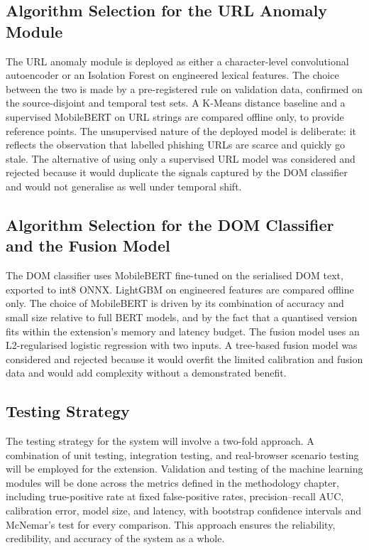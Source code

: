 \documentclass{FastFyp}
\begin{document}
\subsection{Algorithm Selection for the URL Anomaly Module}
The URL anomaly module is deployed as either a character-level convolutional autoencoder or an Isolation Forest on engineered lexical features. The choice between the two is made by a pre-registered rule on validation data, confirmed on the source-disjoint and temporal test sets. A K-Means distance baseline and a supervised MobileBERT on URL strings are compared offline only, to provide reference points. The unsupervised nature of the deployed model is deliberate: it reflects the observation that labelled phishing URLs are scarce and quickly go stale. The alternative of using only a supervised URL model was considered and rejected because it would duplicate the signals captured by the DOM classifier and would not generalise as well under temporal shift.

\subsection{Algorithm Selection for the DOM Classifier and the Fusion Model}
The DOM classifier uses MobileBERT fine-tuned on the serialised DOM text, exported to int8 ONNX. LightGBM on engineered features are compared offline only. The choice of MobileBERT is driven by its combination of accuracy and small size relative to full BERT models, and by the fact that a quantised version fits within the extension's memory and latency budget. The fusion model uses an L2-regularised logistic regression with two inputs. A tree-based fusion model was considered and rejected because it would overfit the limited calibration and fusion data and would add complexity without a demonstrated benefit.

\subsection{Testing Strategy}
The testing strategy for the system will involve a two-fold approach. A combination of unit testing, integration testing, and real-browser scenario testing will be employed for the extension. Validation and testing of the machine learning modules will be done across the metrics defined in the methodology chapter, including true-positive rate at fixed false-positive rates, precision--recall AUC, calibration error, model size, and latency, with bootstrap confidence intervals and McNemar's test for every comparison. This approach ensures the reliability, credibility, and accuracy of the system as a whole.
\end{document}
